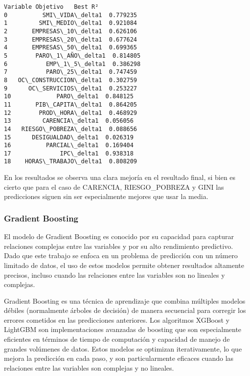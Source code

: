 \documentclass[11pt]{article}
\begin{document}
    
    \begin{Verbatim}[commandchars=\\\{\}]
         Variable Objetivo   Best R²
0          SMI\_VIDA\_delta1  0.779235
1         SMI\_MEDIO\_delta1  0.921084
2       EMPRESAS\_10\_delta1  0.626106
3       EMPRESAS\_20\_delta1  0.677624
4       EMPRESAS\_50\_delta1  0.699365
5        PARO\_1\_AÑO\_delta1  0.814805
6           EMP\_1\_5\_delta1  0.386298
7           PARO\_25\_delta1  0.747459
8   OC\_CONSTRUCCION\_delta1  0.302759
9      OC\_SERVICIOS\_delta1  0.253227
10             PARO\_delta1  0.848125
11       PIB\_CAPITA\_delta1  0.864205
12        PROD\_HORA\_delta1  0.468929
13         CARENCIA\_delta1  0.056056
14   RIESGO\_POBREZA\_delta1  0.088656
15      DESIGUALDAD\_delta1  0.026319
16          PARCIAL\_delta1  0.169404
17              IPC\_delta1  0.938318
18    HORAS\_TRABAJO\_delta1  0.808209
    \end{Verbatim}

    
    En los resultados se observa una clara mejoría en el resultado final, si
bien es cierto que para el caso de CARENCIA, RIESGO\_POBREZA y GINI las
predicciones siguen sin ser especialmente mejores que usar la media.

    \subsubsection{Gradient Boosting}\label{gradient-boosting}

    El modelo de Gradient Boosting es conocido por su capacidad para
capturar relaciones complejas entre las variables y por su alto
rendimiento predictivo. Dado que este trabajo se enfoca en un problema
de predicción con un número limitado de datos, el uso de estos modelos
permite obtener resultados altamente precisos, incluso cuando las
relaciones entre las variables son no lineales y complejas.

Gradient Boosting es una técnica de aprendizaje que combina múltiples
modelos débiles (normalmente árboles de decisión) de manera secuencial
para corregir los errores cometidos en las predicciones anteriores. Los
algoritmos XGBoost y LightGBM son implementaciones avanzadas de boosting
que son especialmente eficientes en términos de tiempo de computación y
capacidad de manejo de grandes volúmenes de datos. Estos modelos se
optimizan iterativamente, lo que mejora la predicción en cada paso, y
son particularmente eficaces cuando las relaciones entre las variables
son complejas y no lineales.
\end{document}
